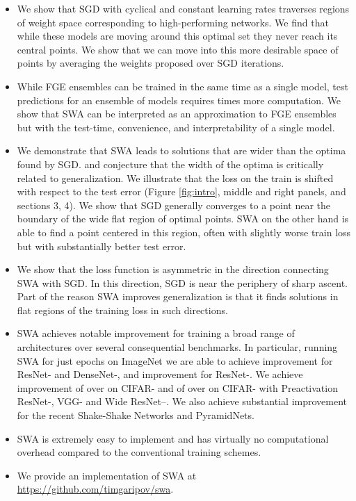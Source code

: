 \documentclass[letterpaper]{article}
\begin{document}
\begin{itemize}
  \item We show that SGD with cyclical
\citep[e.g.,][]{loshchilov2016} and
constant learning rates traverses regions of weight space corresponding 
to high-performing networks.  We find that while these models are moving 
around this optimal set they never reach its central points. We show that we 
can move into this more desirable space of points by averaging the weights proposed
over SGD iterations. 

\item While FGE ensembles \citep{garipov2018} can be trained in the same time as a 
single model, test predictions for an ensemble of  models requires  times more 
computation. We show that SWA can be interpreted as an approximation to FGE ensembles
but with the test-time, convenience, and interpretability of a single model.

\item We demonstrate that SWA leads to solutions that are wider than the optima
found by SGD.  \citet{keskar2017large} and \citet{hochreiter1997flat} conjecture
that the width of the optima is critically related to generalization. We
illustrate that the loss on the train is shifted with respect to the test
error (Figure \ref{fig:intro}, middle and right panels, and sections 
3, 4). We show that
SGD generally converges to a point near the boundary of the 
wide flat region of optimal points. SWA on the other hand is able to find a
point centered in this region, often with slightly worse train loss but with
substantially better test error. 

\item We show that the loss function is asymmetric in the direction connecting
SWA with SGD. In this direction, SGD is near the periphery of sharp ascent.
Part of the reason SWA improves generalization is that it finds solutions in flat regions 
of the training loss in such directions.

\item SWA achieves notable improvement for training a broad range of architectures 
over several consequential benchmarks. In particular, running SWA for just
   epochs on ImageNet we are able to achieve  improvement
  for ResNet- and DenseNet-, and  improvement for
  ResNet-. We achieve improvement of over  on CIFAR- and
  of over  on CIFAR- with Preactivation ResNet-, VGG-
  and Wide ResNet--. We also achieve substantial improvement for
  the recent Shake-Shake Networks and PyramidNets. 

\item SWA is extremely easy to 
implement and has virtually no computational overhead compared to the conventional
training schemes. 

\item We provide an implementation of SWA at \\
\url{https://github.com/timgaripov/swa}.

\end{itemize}
\end{document}
